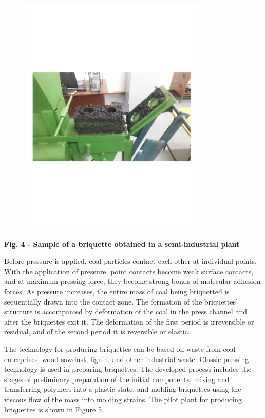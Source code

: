 \begin{figure}[H]
	\centering
	\includegraphics[width=0.8\textwidth]{media/gorn2/image6}
	\caption*{}
\end{figure}


{\bfseries Fig. 4 - Sample of a briquette obtained in a semi-industrial
plant}

Before pressure is applied, coal particles contact each other at
individual points. With the application of pressure, point contacts
become weak surface contacts, and at maximum pressing force, they become
strong bonds of molecular adhesion forces. As pressure increases, the
entire mass of coal being briquetted is sequentially drawn into the
contact zone. The formation of the briquettes'{}
structure is accompanied by deformation of the coal in the press channel
and after the briquettes exit it. The deformation of the first period is
irreversible or residual, and of the second period it is reversible or
elastic.

The technology for producing briquettes can be based on waste from coal
enterprises, wood sawdust, lignin, and other industrial waste. Classic
pressing technology is used in preparing briquettes. The developed
process includes the stages of preliminary preparation of the initial
components, mixing and transferring polymers into a plastic state, and
molding briquettes using the viscous flow of the mass into molding
strains. The pilot plant for producing briquettes is shown in Figure 5.

